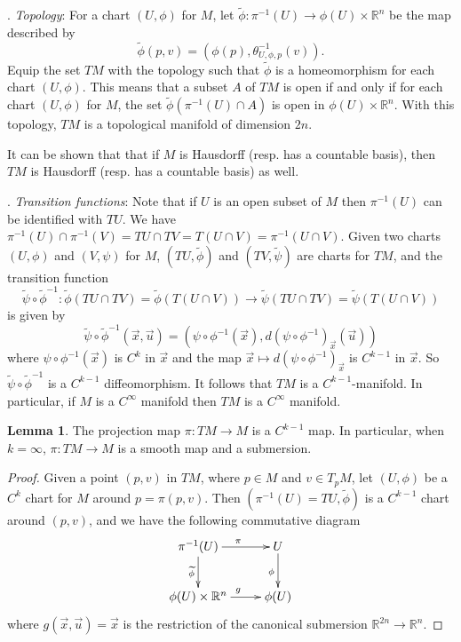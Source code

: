 \documentclass{amsart}
\numberwithin{equation}{section}
\newcommand{\bR}{\mathbb{R}}
\theoremstyle{definition}
\theoremstyle{theorem}
\newtheorem{lemma}[definition]{Lemma}
\begin{document}
. {\em Topology}:
For a chart $(U,\phi)$ for $M$, let $\tilde{\phi} : \pi^{-1}(U) \to \phi(U) \times \mathbb{R}^n$ be the map described by 
\[
\tilde{\phi}(p,v) = (\phi(p), \theta^{-1}_{U,\phi,p}(v)).
\]
Equip the set $TM$ with the topology such that $\tilde{\phi}$ is a homeomorphism for each chart $(U,\phi)$. This means that a subset $A$ of $TM$ is open if and only if for each chart $(U,\phi)$ for $M$, the set $\tilde{\phi}(\pi^{-1}(U) \cap A)$ is open in $\phi(U) \times \mathbb{R}^n$. 
With this topology, $TM$ is a topological manifold of dimension $2n$.

It can be shown that that if $M$ is Hausdorff (resp. has a countable basis), then $TM$ is Hausdorff (resp. has a countable basis) as well. 

. {\em Transition functions}: Note that if $U$ is an open subset of $M$ then 
$\pi^{-1}(U)$ can be identified with $TU$. We have $\pi^{-1}(U)\cap \pi^{-1}(V)= TU\cap TV = T(U\cap V) =\pi^{-1}(U\cap V)$.
Given two charts $(U,\phi)$ and $(V,\psi)$ for $M$, $(TU, \widetilde{\phi})$ and 
$(TV,\widetilde{\psi})$ are charts for $TM$, and the transition function
$$
\widetilde{\psi}\circ \widetilde{\phi}^{-1}: \tilde{\phi}(TU\cap TV) =\tilde{\phi}(T(U\cap V))
\to \tilde{\psi}(TU\cap TV) = \tilde{\psi}(T(U\cap V))  
$$
is given by 
$$
\widetilde{\psi} \circ \widetilde{\phi}^{-1}(\vec{x},\vec{u}) = (\psi \circ \phi^{-1}(\vec{x}), d(\psi \circ \phi^{-1})_{\vec{x}}(\vec{u}))
$$
where $\psi\circ\phi^{-1}(\vec{x})$ is $C^k$ in $\vec{x}$ and
the map $\vec{x} \mapsto d(\psi \circ \phi^{-1})_{\vec{x}}$ is $C^{k-1}$ in $\vec{x}$. So 
$\widetilde{\psi} \circ \widetilde{\phi}^{-1}$ is a $C^{k-1}$ diffeomorphism. It follows that $TM$ is a $C^{k-1}$-manifold.
In particular, if $M$ is a $C^\infty$ manifold then $TM$ is a $C^\infty$ manifold. 

\begin{lemma}
The projection map $\pi : TM \to M$ is a $C^{k-1}$ map. 
In particular, when $k=\infty$, $\pi:TM\to M$ is a smooth map and a submersion.
\end{lemma}
\begin{proof}
Given a point $(p,v)$ in $TM$, where $p\in M$ and $v\in T_pM$, let $(U,\phi)$ be a $C^k$ chart for $M$ around $p=\pi(p,v)$. Then
$(\pi^{-1}(U)=TU,\widetilde{\phi})$ is a $C^{k-1}$ chart around $(p,v)$, and we have the following commutative diagram 
\[
\xymatrix{
\pi^{-1}(U) \ar[r]^{\pi} \ar[d]_{\widetilde{\phi}} & U \ar[d]_{\phi} \\
\phi(U) \ar[r]^g \times \mathbb{R}^n & \phi(U)
}
\]
where $g(\vec{x},\vec{u})= \vec{x}$ is the restriction of the canonical submersion $\bR^{2n} \to \bR^n$. 
\end{proof}
\end{document}
